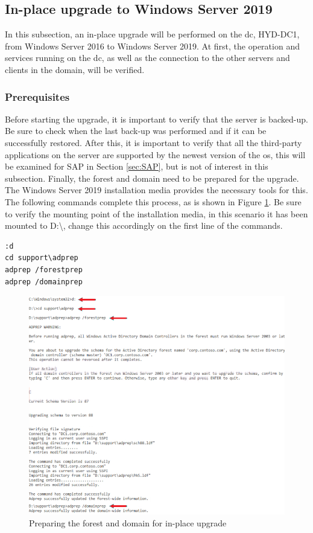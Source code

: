 \subsection{In-place upgrade to Windows Server 2019}
In this subsection, an in-place upgrade will be performed on the \acrfull{dc}, HYD-DC1, from Windows Server 2016 to Windows Server 2019. 
At first, the operation and services running on the \acrshort{dc}, as well as the connection to the other servers and clients in the domain, will be verified.
\subsubsection{Prerequisites}
Before starting the upgrade, it is important to verify that the server is backed-up. 
Be sure to check when the last back-up was performed and if it can be successfully restored. 
After this, it is important to verify that all the third-party applications on the server are supported by the newest version of the \acrshort{os}, this will be examined for SAP in Section \ref{sec:SAP}, but is not of interest in this subsection. 
Finally, the forest and domain need to be prepared for the upgrade. 
The Windows Server 2019 installation media provides the necessary tools for this. 
The following commands complete this process, as is shown in Figure \ref{fig:Prerequisites}. 
Be sure to verify the mounting point of the installation media, in this scenario it has been mounted to D:\textbackslash{}, change this accordingly on the first line of the commands.

\begin{lstlisting}[breaklines]
:d
cd support\adprep
adprep /forestprep
adprep /domainprep
\end{lstlisting}

\begin{figure}[h]
	\includegraphics[width=\linewidth]{img/Methodologie/Prerequisites0.png}
	\captionsetup{width=0.9\linewidth}
	\centering		
	\caption[Preparing forest and domain]{Preparing the forest and domain for in-place upgrade}
	\label{fig:Prerequisites}
\end{figure}
\clearpage

